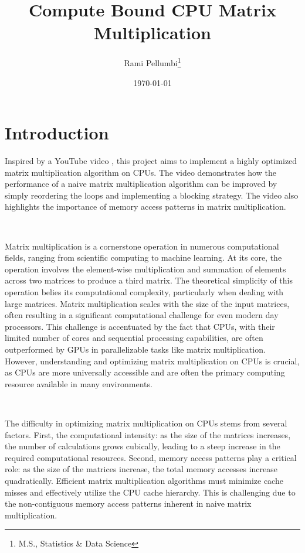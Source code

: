 \documentclass{article}
\title{Compute Bound CPU Matrix Multiplication}
\author{Rami Pellumbi\thanks{M.S., Statistics \& Data Science}}
\date{\today}
\newcommand{\MYhref}[3][blue]{\href{#2}{\color{#1}{#3}}}%
\begin{document}
\maketitle
\tableofcontents

\newpage 

\section{Introduction}
Inspired by a YouTube video \MYhref{https://www.youtube.com/watch?v=QGYvbsHDPxo}{`Adding Nested 
Loops Makes this Algorithm 120x FASTER'}, this project aims to implement a highly optimized
matrix multiplication algorithm on CPUs. The video demonstrates how the performance of a
naive matrix multiplication algorithm can be improved by simply reordering the loops and 
implementing a blocking strategy. The video also highlights the importance of memory access
patterns in matrix multiplication.

\

\noindent Matrix multiplication is a cornerstone operation in numerous computational fields,
ranging from scientific computing to machine learning. At its core, the operation 
involves the element-wise multiplication and summation of elements across two matrices 
to produce a third matrix. The theoretical simplicity of this operation belies its 
computational complexity, particularly when dealing with large matrices. 
Matrix multiplication scales with the size of the input matrices, often resulting 
in a significant computational challenge for even modern day processors. 
This challenge is accentuated by the fact that CPUs, with their limited number 
of cores and sequential processing capabilities, are often outperformed by GPUs in 
parallelizable tasks like matrix multiplication. However, understanding and optimizing 
matrix multiplication on CPUs is crucial, as CPUs are more universally accessible 
and are often the primary computing resource available in many environments.

\ 

\noindent The difficulty in optimizing matrix multiplication on CPUs stems from several factors. 
First, the computational intensity: as the size of the matrices increases, 
the number of calculations grows cubically, leading to a steep increase in the 
required computational resources. Second, memory access patterns play a critical role: as the 
size of the matrices increase, the total memory accesses increase quadratically.
Efficient matrix multiplication algorithms must minimize cache misses and effectively utilize 
the CPU cache hierarchy. This is challenging due to the non-contiguous memory access 
patterns inherent in naive matrix multiplication. 
\end{document}
